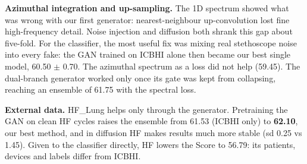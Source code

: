 \documentclass[twoside,english]{article}
\begin{document}
\begin{table}[!ht]
\centering\footnotesize
{}
\caption{Each idea on its own, sorted by ensemble Score.}
\end{table}

\textbf{Azimuthal integration and up-sampling.} The 1D spectrum showed what was wrong with our first generator: nearest-neighbour up-convolution lost fine high-frequency detail. Noise injection and diffusion both shrank this gap about five-fold. For the classifier, the most useful fix was mixing real stethoscope noise into every fake: the GAN trained on ICBHI alone then became our best single model, 60.50 $\pm$ 0.70. The azimuthal spectrum as a loss did not help (59.45). The dual-branch generator worked only once its gate was kept from collapsing, reaching an ensemble of 61.75 with the spectral loss.

\textbf{External data.} HF\_Lung helps only through the generator. Pretraining the GAN on clean HF cycles raises the ensemble from 61.53 (ICBHI only) to \textbf{62.10}, our best method, and in diffusion HF makes results much more stable (sd 0.25 vs 1.45). Given to the classifier directly, HF lowers the Score to 56.79: its patients, devices and labels differ from ICBHI.
\end{document}
